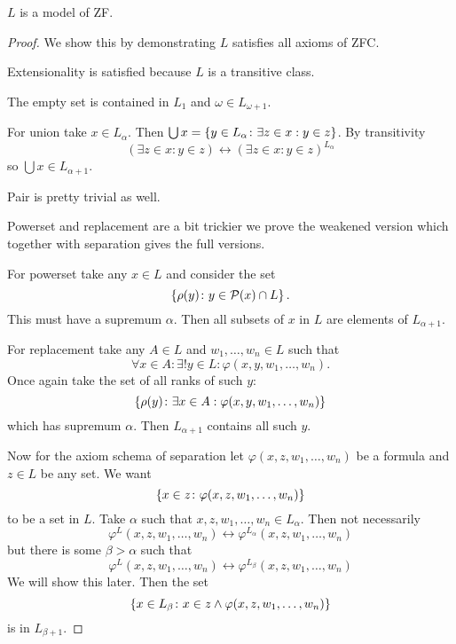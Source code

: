 \begin{proposition}
    \(L\) is a model of ZF.

    \begin{proof}
        We show this by demonstrating \(L\) satisfies all axioms of ZFC.

        Extensionality is satisfied because \(L\) is a transitive class.

        The empty set is contained in \(L_{1}\) and \(\omega\in L_{\omega+1}\).

        For union take \(x\in L_{\alpha}\). Then \(\bigcup x=\left\{y\in
            L_{\alpha}\colon\exists z\in x:y\in z\right\}\). By transitivity
        \[
            (\exists z\in x:y\in z)\leftrightarrow(\exists z\in x:y\in z)^{L_{\alpha}}
        \]
        so \(\bigcup x\in L_{\alpha+1}\).

        Pair is pretty trivial as well.

        Powerset and replacement are a bit trickier we prove the weakened
        version which together with separation gives the full versions.

        For powerset take any \(x\in L\) and consider the set
        \[
            \left\{\rho(y)\colon y\in\mathcal{P}(x)\cap L\right\}.
        \]
        This must have a supremum \(\alpha\). Then all subsets of \(x\) in \(L\)
        are elements of \(L_{\alpha+1}\).

        For replacement take any \(A\in L\) and \(w_{1},\ldots,w_{n}\in L\) such
        that
        \[
            \forall x\in A:\exists!y\in L:\varphi(x,y,w_{1},\ldots,w_{n}).
        \]
        Once again take the set of all ranks of such \(y\):
        \[
            \left\{\rho(y)\colon\exists x\in A:\varphi(x,y,w_{1},\ldots,w_{n})\right\}
        \]
        which has supremum \(\alpha\). Then \(L_{\alpha+1}\) contains all such
        \(y\).

        Now for the axiom schema of separation let
        \(\varphi(x,z,w_{1},\ldots,w_{n})\) be a formula and \(z\in L\) be any
        set. We want
        \[
            \left\{x\in z\colon\varphi(x,z,w_{1},\ldots,w_{n})\right\}
        \]
        to be a set in \(L\). Take \(\alpha\) such that
        \(x,z,w_{1},\ldots,w_{n}\in L_{\alpha}\). Then not necessarily
        \[
            \varphi^{L}(x,z,w_{1},\ldots,w_{n})\leftrightarrow\varphi^{L_{\alpha}}(x,z,w_{1},\ldots,w_{n})
        \]
        but there is some \(\beta>\alpha\) such that
        \[
            \varphi^{L}(x,z,w_{1},\ldots,w_{n})\leftrightarrow\varphi^{L_{\beta}}(x,z,w_{1},\ldots,w_{n})
        \]
        We will show this later. Then the set
        \[
            \left\{x\in L_{\beta}\colon x\in z\wedge\varphi(x,z,w_{1},\ldots,w_{n})\right\}
        \]
        is in \(L_{\beta+1}\).
    \end{proof}
\end{proposition}

